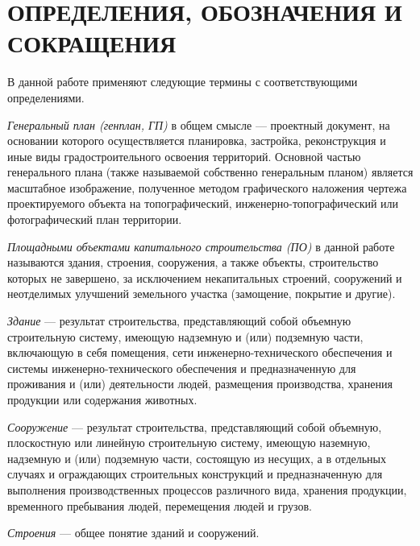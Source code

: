 \section*{\large{ОПРЕДЕЛЕНИЯ, ОБОЗНАЧЕНИЯ И СОКРАЩЕНИЯ}}

В данной работе применяют следующие термины с соответствующими определениями.

\textit{Генеральный план (генплан, ГП)} в общем смысле —
проектный документ, на основании которого осуществляется планировка,
застройка, реконструкция и иные виды градостроительного освоения территорий.
Основной частью генерального плана (также называемой собственно генеральным планом)
является масштабное изображение, полученное методом графического наложения чертежа
проектируемого объекта на топографический,
инженерно-топографический или фотографический план территории.


\textit{Площадными объектами капитального строительства (ПО)} в данной работе называются
здания, строения, сооружения, а также объекты, строительство которых не завершено, за исключением некапитальных строений,
сооружений и неотделимых улучшений земельного участка (замощение, покрытие и другие)\cite{CapitalBuilding}.


\textit{Здание} — результат строительства, представляющий собой объемную строительную систему,
имеющую надземную и (или) подземную части, включающую в себя помещения,
сети инженерно-технического обеспечения и системы инженерно-технического обеспечения и предназначенную для проживания и
(или) деятельности людей, размещения производства, хранения продукции или содержания животных\cite{SafetyBuildings}.


\textit{Сооружение} — результат строительства,
представляющий собой объемную, плоскостную или линейную строительную систему,
имеющую наземную, надземную и (или) подземную части, состоящую из несущих,
а в отдельных случаях и ограждающих строительных конструкций и предназначенную для выполнения
производственных процессов различного вида, хранения продукции, временного пребывания людей,
перемещения людей и грузов\cite{SafetyBuildings}.


\textit{Строения} — общее понятие зданий и сооружений\cite{CivilCode}.
